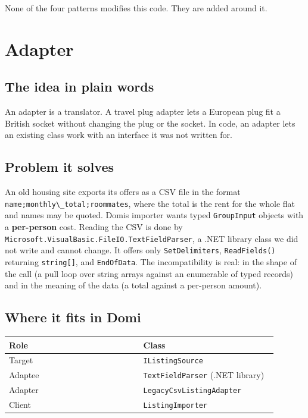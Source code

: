 \documentclass{utmreport}
\providecommand{\passthrough}[1]{#1}
\newcounter{none}
\begin{document}
None of the four patterns modifies this code. They are added around it.

\chapter{Adapter}

\section{The idea in plain words}

An adapter is a translator. A travel plug adapter lets a European plug fit a British socket without changing the plug or the socket. In code, an adapter lets an existing class work with an interface it was not written for.

\section{Problem it solves}

An old housing site exports its offers as a CSV file in the format \passthrough{\lstinline!name;monthly\_total;roommates!}, where the total is the rent for the whole flat and names may be quoted. Domi\textquotesingle s importer wants typed \passthrough{\lstinline!GroupInput!} objects with a \textbf{per-person} cost. Reading the CSV is done by \passthrough{\lstinline!Microsoft.VisualBasic.FileIO.TextFieldParser!}, a .NET library class we did not write and cannot change. It offers only \passthrough{\lstinline!SetDelimiters!}, \passthrough{\lstinline!ReadFields()!} returning \passthrough{\lstinline!string[]!}, and \passthrough{\lstinline!EndOfData!}. The incompatibility is real: in the shape of the call (a pull loop over string arrays against an enumerable of typed records) and in the meaning of the data (a total against a per-person amount).

\section{Where it fits in Domi}

{\def\LTcaptype{none} %
\begin{longtable}[]{@{}>{\raggedright\arraybackslash}p{0.480\linewidth}>{\raggedright\arraybackslash}p{0.480\linewidth}@{}}
\toprule\noalign{}
Role & Class \\
\midrule\noalign{}
\endhead
\bottomrule\noalign{}
\endlastfoot
Target & \passthrough{\lstinline!IListingSource!} \\
Adaptee & \passthrough{\lstinline!TextFieldParser!} (.NET library) \\
Adapter & \passthrough{\lstinline!LegacyCsvListingAdapter!} \\
Client & \passthrough{\lstinline!ListingImporter!} \\
\end{longtable}
}
\end{document}
